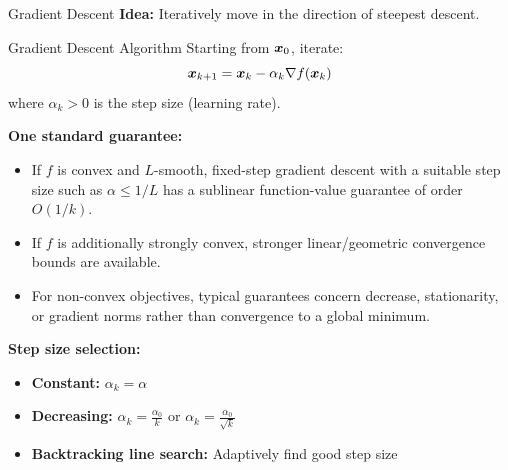 \documentclass[aspectratio=169]{beamer}
\begin{document}
\begin{frame}{Gradient Descent}
  \textbf{Idea:} Iteratively move in the direction of steepest descent.

  \vspace{0.5em}

  \begin{definitionbox}{Gradient Descent Algorithm}
    Starting from $\boldsymbol{x}_0$, iterate:
    $$\boldsymbol{x}_{k+1} = \boldsymbol{x}_k - \alpha_k \nabla f(\boldsymbol{x}_k)$$
    where $\alpha_k > 0$ is the step size (learning rate).
  \end{definitionbox}

  \vspace{0.5em}

  \textbf{One standard guarantee:}
  \begin{itemize}
    \item If $f$ is convex and $L$-smooth, fixed-step gradient descent with a suitable step size such as $\alpha\leq 1/L$ has a sublinear function-value guarantee of order $O(1/k)$.
    \item If $f$ is additionally strongly convex, stronger linear/geometric convergence bounds are available.
    \item For non-convex objectives, typical guarantees concern decrease, stationarity, or gradient norms rather than convergence to a global minimum.
  \end{itemize}

  \vspace{0.5em}

  \textbf{Step size selection:}
  \begin{itemize}
    \item \textbf{Constant:} $\alpha_k = \alpha$
    \item \textbf{Decreasing:} $\alpha_k = \frac{\alpha_0}{k}$ or $\alpha_k = \frac{\alpha_0}{\sqrt{k}}$
    \item \textbf{Backtracking line search:} Adaptively find good step size
  \end{itemize}
\end{frame}
\end{document}
